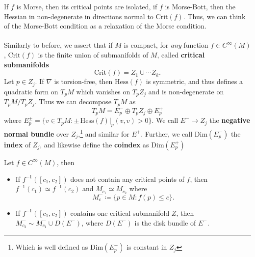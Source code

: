 \documentclass[11pt, final]{article}
\begin{document}
\begin{remark}
	If $ f $ is Morse, then its critical points are isolated, if $ f $ is Morse-Bott, then the Hessian in non-degenerate in directions normal to $ \mathrm{Crit} (f) $. Thus, we can think of the Morse-Bott condition as a relaxation of the Morse condition.
\end{remark}

\paragraph{} Similarly to before, we assert that if $ M $ is compact, for \textit{any} function $ f \in C^\infty(M) $, $ \mathrm{Crit} (f) $ is the finite union of submanifolds of $ M $, called \textbf{critical submanifolds}
	\begin{equation*}
		\mathrm{Crit} (f) = Z_1 \cup \cdots Z_k.
	\end{equation*}
Let $ p \in Z_j $. If $ \nabla $ is torsion-free, then $ \mathrm{Hess} (f) $ is symmetric, and thus defines a quadratic form on $ T_pM $ which vanishes on $ T_pZ_j $ and is non-degenerate on $ T_pM / T_pZ_j $. Thus we can decompose $ T_pM $ as
	\begin{equation*}
		T_pM = E^-_p \oplus T_pZ_j \oplus E^+_p
	\end{equation*}
where $ E^\pm_p = \{ v \in T_pM : \pm \, \mathrm{Hess} (f)|_p (v,v) > 0 \} $. We call $ E^- \to Z_j $ the \textbf{negative normal bundle} over $ Z_j $,\footnote{Which is well defined as $ \mathrm{Dim}(E^-_p) $ is constant in $ Z_j  $} and similar for $ E^+ $. Further, we call $ \mathrm{Dim} (E^-_p) $ the \textbf{index} of $ Z_j $, and likewise define the \textbf{coindex} as $ \mathrm{Dim} (E^+_p) $

\begin{theorem}
	Let $ f \in C^\infty(M) $, then
	\begin{itemize}
		\item If $ f^{-1}\left( [c_1,c_2] \right) $ does not contain any critical points of $ f $, then $ f^{-1}(c_1) \simeq f^{-1}(c_2) $ and $ M^-_{c_1} \simeq M^-_{c_2} $ where
			\begin{equation}
			M^-_c \coloneqq \{p \in M : f(p) \leq c \}.
			\end{equation}
		\item If $ f^{-1} \left( [c_1,c_2] \right) $ contains one critical submanifold $ Z $, then $ M^-_{c_2} \sim M^-_{c_1} \cup D(E^-) $, where $ D(E^-) $ is the disk bundle of $ E^- $.
	\end{itemize}
\end{theorem}
\end{document}
